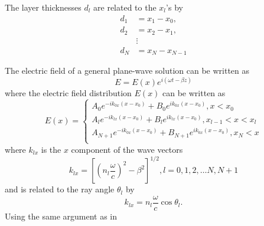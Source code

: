 \documentclass[12pt]{article}
\begin{document}
The layer thicknesses $d_l$ are related to the $x_l$'s by 
\begin{equation}
\begin{aligned}
d_1 &= x_1 - x_0, \\
d_2 &= x_2 - x_1, \\
& \vdots  \\
d_N &= x_N - x_{N-1} 
\end{aligned}
\end{equation}

The electric field of a general plane-wave solution can be written as 
\begin{equation}
E = E(x) e^{i (\omega t - \beta z)}
\end{equation}
where the electric field distribution $E(x)$ can be written as 
\begin{equation}
E(x) = \begin{cases}
A_0 e^{-i k_{0x} (x - x_0)} + B_0 e^{i k_{0x} (x - x_0)}, x < x_0 \\
A_l e^{-i k_{lx} (x - x_0)} + B_l e^{i k_{l x} (x - x_0)}, x_{l-1} < x < x_l \\
A_{N+1} e^{-i k_{0x} (x - x_0)} + B_{N+1} e^{i k_{0x} (x - x_0)}, x_{N} < x \\
\end{cases}
\end{equation}
where $k_{lx}$ is the $x$ component of the wave vectors
\begin{equation}
k_{lx} = \left [ \left ( n_l \frac{\omega}{c} \right ) ^2 - \beta^2 \right ] ^{1/2}, l = 0, 1, 2, \ldots N, N+1
\end{equation}
and is related to the ray angle $\theta_l$ by
\begin{equation}
k_{lx} = n_l \frac{\omega}{c} \cos \theta_l.  
\end{equation}
Using the same argument as in 





\end{document}
